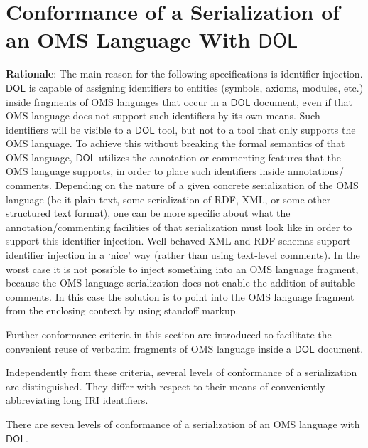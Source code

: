 \documentclass[10pt,fleqn,final]{scrreprt}
\newcommand{\cbs}[0]{\color{red}\xspace} %
\newcommand{\cbe}[0]{\color{black}\xspace} %
\newcommand*{\termref}[1]{\index{#1}#1\xspace}
\newcommand*{\DOL}{\ensuremath{\mathsf{DOL}}\xspace}
\newcommand{\sclause}[1]{\section{#1}}
\begin{document}
\sclause{Conformance of a Serialization of an OMS Language With \DOL}\label{c:conform:serialization}
\begin{fminipage}{\textwidth}
\textbf{Rationale}: The main reason for the following specifications is identifier injection. \DOL is capable
of assigning identifiers to entities (symbols, axioms, modules, etc.) inside fragments of OMS
languages that occur in a \DOL document, even if that OMS language does not support such identifiers
by its own means. 
Such identifiers will be visible to a \DOL tool, but not to a tool that only supports the OMS
language.  To achieve this without breaking the formal semantics of that OMS language,
 \cbs \DOL utilizes \cbe the \termref{annotation} or commenting features that the OMS language supports, 
 in order to place such
identifiers inside annotations/ comments.  
Depending on the nature of\cbs a given concrete\cbe
serialization of the OMS language (be it plain text, some serialization of RDF, XML, or some other 
structured text format), one can be more specific about what the annotation/commenting facilities of
that serialization must look like in order to support this identifier injection.  
Well-behaved XML and RDF schemas support identifier injection in a `nice' way (rather than using
text-level comments). \cbs In the worst case it is not possible to
inject something into an OMS language fragment, because the OMS language serialization 
does not enable the addition of suitable comments. In this case the solution is to point into the OMS language fragment from the enclosing context \cbe
by using \termref{standoff markup}.


Further conformance criteria in this section are introduced to facilitate the convenient reuse of
verbatim fragments of OMS language inside a \DOL document.

Independently from these criteria,  \cbs several levels of conformance of a
serialization are distinguished. They differ with respect to their means of conveniently abbreviating long IRI identifiers. \cbe
\end{fminipage}

\cbs There are seven levels of conformance of a serialization of an OMS language with \DOL{}.
\cbe
\end{document}
